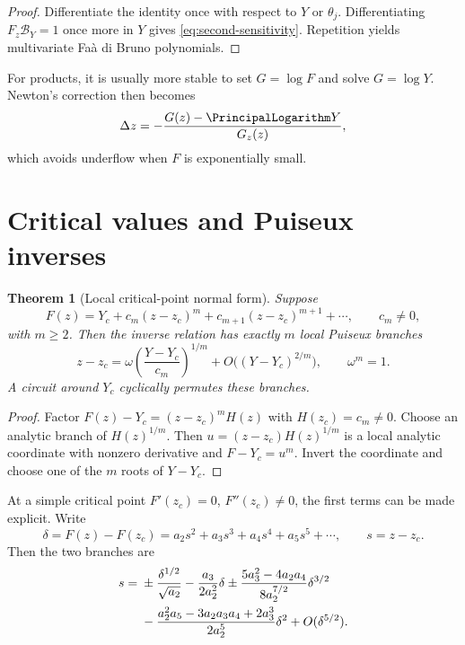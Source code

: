 \documentclass[11pt,a4paper,oneside,openany]{book}
\newtheorem{theorem}{Theorem}[chapter]
\theoremstyle{definition}
\theoremstyle{remark}
\newcommand{\branch}{\mathscr B}
\begin{document}
\begin{proof}
Differentiate the identity once with respect to \(Y\) or \(\theta_j\).
Differentiating \(F_z\branch_Y=1\) once more in \(Y\) gives
\eqref{eq:second-sensitivity}.  Repetition yields multivariate
Fa\`a di Bruno polynomials.
\end{proof}

For products, it is usually more stable to set \(G=\log F\) and solve
\(G=\log Y\).  Newton's correction then becomes
\[
 \Delta z=-\frac{G(z)-\PrincipalLogarithm Y}{G_z(z)},
\]
which avoids underflow when \(F\) is exponentially small.

\section{Critical values and Puiseux inverses}

\begin{theorem}[Local critical-point normal form]\label{thm:puiseux-normal}
Suppose
\[
 F(z)=Y_c+c_m(z-z_c)^m+c_{m+1}(z-z_c)^{m+1}+\cdots,
 \qquad c_m\ne0,
\]
with \(m\ge2\).  Then the inverse relation has exactly \(m\) local Puiseux
branches
\begin{equation}\label{eq:puiseux-leading}
 z-z_c=\omega\left(\frac{Y-Y_c}{c_m}\right)^{1/m}
 +O\bigl((Y-Y_c)^{2/m}\bigr),\qquad \omega^m=1.
\end{equation}
A circuit around \(Y_c\) cyclically permutes these branches.
\end{theorem}

\begin{proof}
Factor
\(F(z)-Y_c=(z-z_c)^mH(z)\) with \(H(z_c)=c_m\ne0\).  Choose an analytic
branch of \(H(z)^{1/m}\).  Then
\(u=(z-z_c)H(z)^{1/m}\) is a local analytic coordinate with nonzero
derivative and \(F-Y_c=u^m\).  Invert the coordinate and choose one of the
\(m\) roots of \(Y-Y_c\).
\end{proof}

At a simple critical point \(F'(z_c)=0\), \(F''(z_c)\ne0\), the first terms
can be made explicit.  Write
\[
 \delta=F(z)-F(z_c)=a_2s^2+a_3s^3+a_4s^4+a_5s^5+\cdots,
 \qquad s=z-z_c.
\]
Then the two branches are
\begin{align}
 s={}&\pm\frac{\delta^{1/2}}{\sqrt{a_2}}
 -\frac{a_3}{2a_2^2}\delta
 \pm\frac{5a_3^2-4a_2a_4}{8a_2^{7/2}}\delta^{3/2}\notag\\
 &-\frac{a_2^2a_5-3a_2a_3a_4+2a_3^3}{2a_2^5}\delta^2
 +O(\delta^{5/2}).
\label{eq:simple-critical-puiseux}
\end{align}
\end{document}

